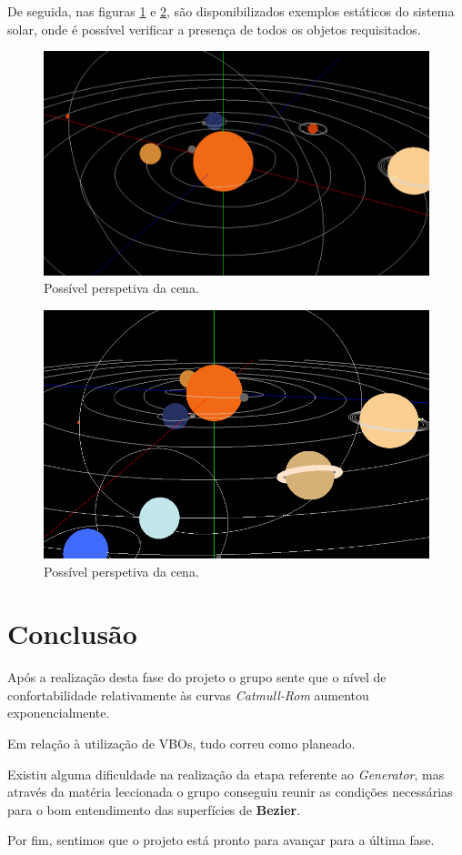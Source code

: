 \documentclass[a4paper]{article}
\begin{document}
De seguida, nas figuras \ref{img:scene_1} e \ref{img:scene_2}, são disponibilizados exemplos estáticos do sistema solar, onde é possível verificar a presença de todos os objetos requisitados.

\begin{figure}[H]
\centering
\includegraphics[scale=0.3]{scene_1.png}
\caption{Possível perspetiva da cena.}
\label{img:scene_1}
\end{figure}

\begin{figure}[H]
\centering
\includegraphics[scale=0.36]{scene_2.png}
\caption{Possível perspetiva da cena.}
\label{img:scene_2}
\end{figure}


\section{Conclusão}
\label{sec:conclusao}

Após a realização desta fase do projeto o grupo sente que o nível de confortabilidade relativamente às curvas \textit{Catmull-Rom} aumentou exponencialmente.

Em relação à utilização de VBOs, tudo correu como planeado.

Existiu alguma dificuldade na realização da etapa referente ao \textit{Generator}, mas através da matéria leccionada o grupo conseguiu reunir as condições necessárias para o bom entendimento das superfícies de \textbf{Bezier}.

Por fim, sentimos que o projeto está pronto para avançar para a última fase.
\end{document}
